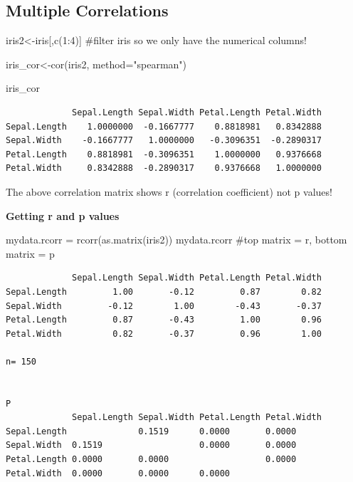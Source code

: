 \documentclass[
  letterpaper,
  DIV=11,
  numbers=noendperiod]{scrartcl}
\newenvironment{Shaded}{\begin{snugshade}}{\end{snugshade}}
\newcommand{\AttributeTok}[1]{\textcolor[rgb]{0.40,0.45,0.13}{#1}}
\newcommand{\CommentTok}[1]{\textcolor[rgb]{0.37,0.37,0.37}{#1}}
\newcommand{\DecValTok}[1]{\textcolor[rgb]{0.68,0.00,0.00}{#1}}
\newcommand{\FunctionTok}[1]{\textcolor[rgb]{0.28,0.35,0.67}{#1}}
\newcommand{\NormalTok}[1]{\textcolor[rgb]{0.00,0.23,0.31}{#1}}
\newcommand{\OtherTok}[1]{\textcolor[rgb]{0.00,0.23,0.31}{#1}}
\newcommand{\SpecialCharTok}[1]{\textcolor[rgb]{0.37,0.37,0.37}{#1}}
\newcommand{\StringTok}[1]{\textcolor[rgb]{0.13,0.47,0.30}{#1}}
\begin{document}
\subsection{Multiple Correlations}

\begin{Shaded}
\begin{Highlighting}[]
\NormalTok{iris2}\OtherTok{\textless{}{-}}\NormalTok{iris[,}\FunctionTok{c}\NormalTok{(}\DecValTok{1}\SpecialCharTok{:}\DecValTok{4}\NormalTok{)] }\CommentTok{\#filter iris so we only have the numerical columns!}

\NormalTok{iris\_cor}\OtherTok{\textless{}{-}}\FunctionTok{cor}\NormalTok{(iris2, }\AttributeTok{method=}\StringTok{"spearman"}\NormalTok{)}

\NormalTok{iris\_cor}
\end{Highlighting}
\end{Shaded}

\begin{verbatim}
             Sepal.Length Sepal.Width Petal.Length Petal.Width
Sepal.Length    1.0000000  -0.1667777    0.8818981   0.8342888
Sepal.Width    -0.1667777   1.0000000   -0.3096351  -0.2890317
Petal.Length    0.8818981  -0.3096351    1.0000000   0.9376668
Petal.Width     0.8342888  -0.2890317    0.9376668   1.0000000
\end{verbatim}

The above correlation matrix shows r (correlation coefficient) not p
values!

\textbf{Getting r and p values}

\begin{Shaded}
\begin{Highlighting}[]
\NormalTok{mydata.rcorr }\OtherTok{=} \FunctionTok{rcorr}\NormalTok{(}\FunctionTok{as.matrix}\NormalTok{(iris2))}
\NormalTok{mydata.rcorr }\CommentTok{\#top matrix = r, bottom matrix = p}
\end{Highlighting}
\end{Shaded}

\begin{verbatim}
             Sepal.Length Sepal.Width Petal.Length Petal.Width
Sepal.Length         1.00       -0.12         0.87        0.82
Sepal.Width         -0.12        1.00        -0.43       -0.37
Petal.Length         0.87       -0.43         1.00        0.96
Petal.Width          0.82       -0.37         0.96        1.00

n= 150 


P
             Sepal.Length Sepal.Width Petal.Length Petal.Width
Sepal.Length              0.1519      0.0000       0.0000     
Sepal.Width  0.1519                   0.0000       0.0000     
Petal.Length 0.0000       0.0000                   0.0000     
Petal.Width  0.0000       0.0000      0.0000                  
\end{verbatim}
\end{document}
